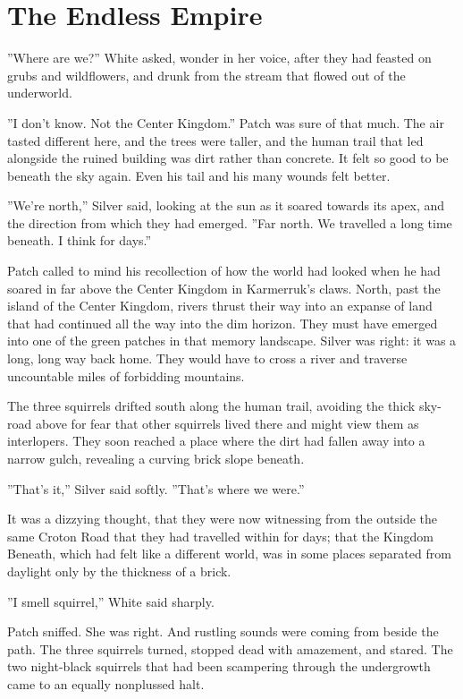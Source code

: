 \documentclass[12pt]{book}
\begin{document}
\section{The Endless Empire}

''Where are we?'' White asked, wonder in her voice, after they had feasted on grubs and wildflowers, and drunk from the stream that flowed out of the underworld.

''I don't know. Not the Center Kingdom.'' Patch was sure of that much. The air tasted different here, and the trees were taller, and the human trail that led alongside the ruined building was dirt rather than concrete. It felt so good to be beneath the sky again. Even his tail and his many wounds felt better.

''We're north,'' Silver said, looking at the sun as it soared towards its apex, and the direction from which they had emerged. ''Far north. We travelled a long time beneath. I think for days.''

Patch called to mind his recollection of how the world had looked when he had soared in far above the Center Kingdom in Karmerruk's claws. North, past the island of the Center Kingdom, rivers thrust their way into an expanse of land that had continued all the way into the dim horizon. They must have emerged into one of the green patches in that memory landscape. Silver was right: it was a long, long way back home. They would have to cross a river and traverse uncountable miles of forbidding mountains.

The three squirrels drifted south along the human trail, avoiding the thick sky-road above for fear that other squirrels lived there and might view them as interlopers. They soon reached a place where the dirt had fallen away into a narrow gulch, revealing a curving brick slope beneath.

''That's it,'' Silver said softly. ''That's where we were.''

It was a dizzying thought, that they were now witnessing from the outside the same Croton Road that they had travelled within for days; that the Kingdom Beneath, which had felt like a different world, was in some places separated from daylight only by the thickness of a brick.

''I smell squirrel,'' White said sharply.

Patch sniffed. She was right. And rustling sounds were coming from beside the path. The three squirrels turned, stopped dead with amazement, and stared. The two night-black squirrels that had been scampering through the undergrowth came to an equally nonplussed halt.
\end{document}

